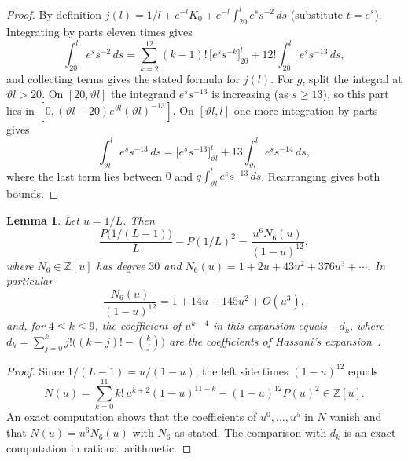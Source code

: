 \documentclass{amsart}
\newtheorem{lemma}[theorem]{Lemma}
\theoremstyle{definition}
\theoremstyle{remark}
\theoremstyle{plain}
\numberwithin{equation}{section}
\begin{document}
\begin{proof}
By definition $j(l)=1/l+e^{-l}K_0+e^{-l}\int_{20}^le^ss^{-2}\,ds$ (substitute $t=e^s$). Integrating by parts eleven times gives
\[
\int_{20}^le^ss^{-2}\,ds=\sum_{k=2}^{12}(k-1)!\,\bigl[e^ss^{-k}\bigr]_{20}^{l}+12!\int_{20}^le^ss^{-13}\,ds,
\]
and collecting terms gives the stated formula for $j(l)$. For $g$, split the integral at $\vartheta l>20$. On $[20,\vartheta l]$ the integrand $e^ss^{-13}$ is increasing (as $s\ge13$), so this part lies in $[0,(\vartheta l-20)e^{\vartheta l}(\vartheta l)^{-13}]$. On $[\vartheta l,l]$ one more integration by parts gives
\[
\int_{\vartheta l}^le^ss^{-13}\,ds=\bigl[e^ss^{-13}\bigr]_{\vartheta l}^{l}+13\int_{\vartheta l}^le^ss^{-14}\,ds,
\]
where the last term lies between $0$ and $q\int_{\vartheta l}^le^ss^{-13}\,ds$. Rearranging gives both bounds.
\end{proof}

\begin{lemma}\label{lem:N6}
Let $u=1/L$. Then
\[
\frac{P\bigl(1/(L-1)\bigr)}{L}-P(1/L)^2=\frac{u^6N_6(u)}{(1-u)^{12}},
\]
where $N_6\in\mathbb Z[u]$ has degree $30$ and $N_6(u)=1+2u+43u^2+376u^3+\cdots$. In particular
\[
\frac{N_6(u)}{(1-u)^{12}}=1+14u+145u^2+O(u^3),
\]
and, for $4\le k\le9$, the coefficient of $u^{k-4}$ in this expansion equals $-d_k$, where $d_k=\sum_{j=0}^{k}j!\bigl((k-j)!-\binom kj\bigr)$ are the coefficients of Hassani's expansion~\cite{Has21}.
\end{lemma}

\begin{proof}
Since $1/(L-1)=u/(1-u)$, the left side times $(1-u)^{12}$ equals
\[
N(u)=\sum_{k=0}^{11}k!\,u^{k+2}(1-u)^{11-k}-(1-u)^{12}P(u)^2\in\mathbb Z[u].
\]
An exact computation shows that the coefficients of $u^0,\dots,u^5$ in $N$ vanish and that $N(u)=u^6N_6(u)$ with $N_6$ as stated. The comparison with $d_k$ is an exact computation in rational arithmetic.
\end{proof}
\end{document}
